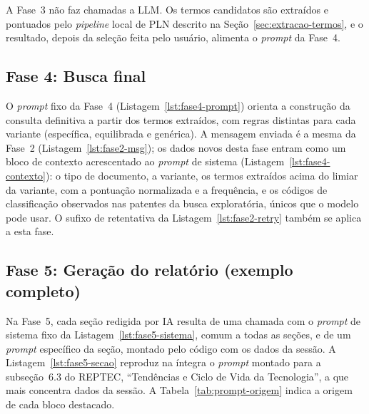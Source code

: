 \documentclass[12pt, a4paper]{article}
\begin{document}
  A Fase~3 não faz chamadas a LLM. Os termos candidatos são extraídos e
pontuados pelo \textit{pipeline} local de PLN descrito na
Seção~\ref{sec:extracao-termos}, e o resultado, depois da seleção feita pelo
usuário, alimenta o \textit{prompt} da Fase~4.

  \subsection{Fase 4: Busca final}

  O \textit{prompt} fixo da Fase~4 (Listagem~\ref{lst:fase4-prompt}) orienta
a construção da consulta definitiva a partir dos termos extraídos, com regras
distintas para cada variante (específica, equilibrada e genérica). A mensagem
enviada é a mesma da Fase~2 (Listagem~\ref{lst:fase2-msg}); os dados novos
desta fase entram como um bloco de contexto acrescentado ao \textit{prompt} de
sistema (Listagem~\ref{lst:fase4-contexto}): o tipo de documento, a variante,
os termos extraídos acima do limiar da variante, com a pontuação normalizada e
a frequência, e os códigos de classificação observados nas patentes da busca
exploratória, únicos que o modelo pode usar. O sufixo de retentativa da
Listagem~\ref{lst:fase2-retry} também se aplica a esta fase.





  \subsection{Fase 5: Geração do relatório (exemplo completo)}

  Na Fase~5, cada seção redigida por IA resulta de uma chamada com o
\textit{prompt} de sistema fixo da Listagem~\ref{lst:fase5-sistema},
comum a todas as seções, e de um \textit{prompt} específico da seção, montado
pelo código com os dados da sessão. A Listagem~\ref{lst:fase5-secao} reproduz
na íntegra o \textit{prompt} montado para a subseção~6.3 do REPTEC,
``Tendências e Ciclo de Vida da Tecnologia'', a que mais concentra dados da
sessão. A Tabela~\ref{tab:prompt-origem} indica a origem de cada bloco
destacado.


\end{document}
